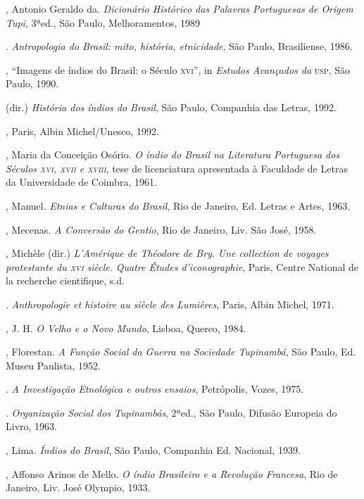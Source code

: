 \begin{bibliohedra}
, Antonio Geraldo da. \textit{Dicionário Histórico das Palavras
Portuguesas de Origem Tupi}, 3ªed., São Paulo, Melhoramentos, 1989

\titidem. \textit{Antropologia do Brasil: mito,
história, etnicidade}, São Paulo, Brasiliense, 1986.

\titidem, ``Imagens de índios do Brasil: o Século
\textsc{xvi}'', in \textit{Estudos Avançados da} \textsc{usp}, São Paulo, 1990.

\titidem (dir.) \textit{História dos índios do
Brasil}, São Paulo, Companhia das Letras, 1992.

, Paris, Albin Michel/Unesco, 1992. 

, Maria da Conceição Osório. \textit{O índio do Brasil na
Literatura Portuguesa dos Séculos \textsc{xvi}, \textsc{xvii} e \textsc{xviii}}, tese de
licenciatura apresentada à Faculdade de Letras da Universidade de Coimbra, 1961.

, Manuel. \textit{Etnias e Culturas do Brasil}, Rio de
Janeiro, Ed. Letras e Artes, 1963.

, Mecenas. \textit{A Conversão do Gentio}, Rio de Janeiro, Liv.
São José, 1958.

, Michèle (dir.) \textit{L'Amérique de Théodore de Bry.}
\textit{Une collection de voyages protestante du \textsc{xvi} siècle.}
\textit{Quatre Études d'iconographie}, Paris, Centre National de la
recherche cientifique, s.d.

\titidem. \textit{Anthropologie et histoire au siècle des
Lumières}, Paris, Albin Michel, 1971.

, J. H. \textit{O Velho e o Novo Mundo}, Lisboa, Querco, 1984. 

, Florestan. \textit{A Função Social da Guerra na Sociedade
Tupinambá}, São Paulo, Ed. Museu Paulista, 1952.

\titidem. \textit{A Investigação Etnológica e outros
ensaios}, Petrópolis, Vozes, 1975.

\titidem. \textit{Organização Social dos Tupinambás}, 
2ªed., São Paulo, Difusão Europeia do Livro, 1963.

, Lima. \textit{Índios do Brasil}, São Paulo, Companhia Ed.
Nacional, 1939.

, Affonso Arinos de Mello. \textit{O índio Brasileiro e a
Revolução Francesa}, Rio de Janeiro, Liv. José Olympio, 1933.


\end{bibliohedra}
